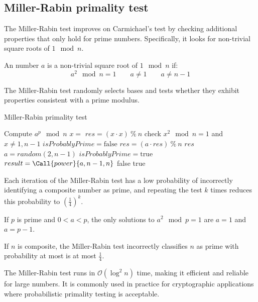 \subsection{Miller-Rabin primality test}
The Miller-Rabin test improves on Carmichael's test by checking additional properties that only hold for prime numbers. 
Specifically, it looks for non-trivial square roots of $1\mod n$. 
\begin{definition}
    An number $a$ is a non-trivial square root of $1 \mod n$ if: 
    \[a^2 \mod n = 1 \qquad a \neq 1 \qquad a \neq n - 1\]
\end{definition}
The Miller-Rabin test randomly selects bases and tests whether they exhibit properties consistent with a prime modulus.
\begin{algorithm}[H]
    \caption{Miller-Rabin primality test}
    \begin{algorithmic}[1]
             \Comment Compute $a^p \mod n$
                \State {}
            \EndIf 
            \State $x=$ 
            \State $res= (x \cdot x)\:\%\:n$
             \Comment check $x^2 \mod n = 1$ and $x \neq 1, n-1$
                \State $isProbablyPrime=\text{false}$
            \EndIf
                \State $res=(a\cdot res)\:\%\:n$
            \EndIf
            \State \Return $res$
        \EndFunction
        \Statex 
            \State $a = random(2, n-1)$
            \State $isProbablyPrime = \text{true}$
            \State $result = \Call{power}{a, n-1, n}$
                \State \Return false
            \Else
                \State \Return true
            \EndIf
        \EndFunction
    \end{algorithmic}
\end{algorithm}
Each iteration of the Miller-Rabin test has a low probability of incorrectly identifying a composite number as prime, and repeating the test $k$ times reduces this probability to $\left(\frac{1}{4}\right)^k$. 
\begin{theorem}
    If $p$ is prime and $0 < a < p$, the only solutions to $a^2 \mod p = 1$ are $a = 1$ and $a = p - 1$.
\end{theorem}
\begin{theorem}
    If $n$ is composite, the Miller-Rabin test incorrectly classifies $n$ as prime with probability at most is at most $\frac{1}{4}$.
\end{theorem}
The Miller-Rabin test runs in $\mathcal{O}(\log^2n)$ time, making it efficient and reliable for large numbers. 
It is commonly used in practice for cryptographic applications where probabilistic primality testing is acceptable.